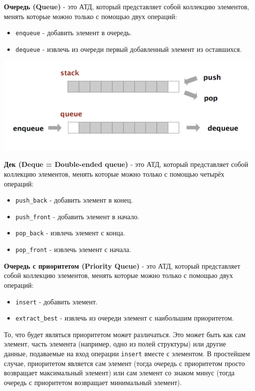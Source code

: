\documentclass{article}
\begin{document}
\textbf{Очередь (Queue)} - это АТД, который представляет собой коллекцию элементов, менять которые можно только с помощью двух операций:
\begin{itemize}
\item \texttt{enqueue} - добавить элемент в очередь.
\item \texttt{dequeue} - извлечь из очереди первый добавленный элемент из оставшихся.
\end{itemize}

\begin{center}
\includegraphics[scale=0.31]{../images/stack_queue.png}
\end{center}

\textbf{Дек (Deque = Double-ended queue)} - это АТД, который представляет собой коллекцию элементов, менять которые можно только с помощью четырёх операций:
\begin{itemize}
\item \texttt{push\_back} - добавить элемент в конец.
\item \texttt{push\_front} - добавить элемент в начало.
\item \texttt{pop\_back} - извлечь элемент с конца.
\item \texttt{pop\_front} - извлечь элемент с начала.\\
\end{itemize}

\textbf{Очередь с приоритетом (Priority Queue)} - это АТД, который представляет собой коллекцию элементов, менять которые можно только с помощью двух операций:
\begin{itemize}
\item \texttt{insert} - добавить элемент.
\item \texttt{extract\_best} - извлечь из очереди элемент с наибольшим приоритетом. 
\end{itemize}
То, что будет являться приоритетом может различаться. Это может быть как сам элемент, часть элемента (например, одно из полей структуры) или другие данные, подаваемые на вход операции \texttt{insert} вместе с элементом. В простейшем случае, приоритетом является сам элемент (тогда очередь с приоритетом просто возвращает максимальный элемент) или сам элемент со знаком минус (тогда очередь с приоритетом возвращает минимальный элемент).
\end{document}
